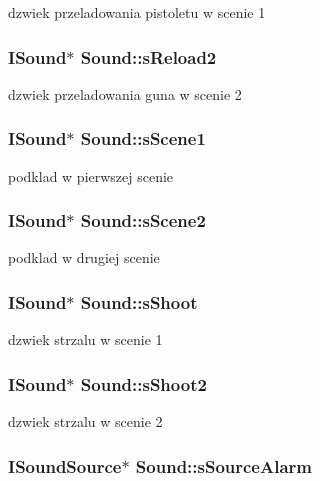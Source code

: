 \label{class_sound_af7bd98fddb7793a24c3159a77df5ee08}
dzwiek przeladowania pistoletu w scenie 1 \hypertarget{class_sound_ae71eeccc328dd51f772f5a196179cb25}{
\subsubsection[{sReload2}]{\setlength{\rightskip}{0pt plus 5cm}ISound$\ast$ {\bf Sound::sReload2}}}
\label{class_sound_ae71eeccc328dd51f772f5a196179cb25}
dzwiek przeladowania guna w scenie 2 \hypertarget{class_sound_a77990d3d0d401582f3d3fc291d6c05a2}{
\subsubsection[{sScene1}]{\setlength{\rightskip}{0pt plus 5cm}ISound$\ast$ {\bf Sound::sScene1}}}
\label{class_sound_a77990d3d0d401582f3d3fc291d6c05a2}
podklad w pierwszej scenie \hypertarget{class_sound_a9316f922062f2aada3c4d83088bb21e6}{
\subsubsection[{sScene2}]{\setlength{\rightskip}{0pt plus 5cm}ISound$\ast$ {\bf Sound::sScene2}}}
\label{class_sound_a9316f922062f2aada3c4d83088bb21e6}
podklad w drugiej scenie \hypertarget{class_sound_a8932916979c5479e73225def2abe1f42}{
\subsubsection[{sShoot}]{\setlength{\rightskip}{0pt plus 5cm}ISound$\ast$ {\bf Sound::sShoot}}}
\label{class_sound_a8932916979c5479e73225def2abe1f42}
dzwiek strzalu w scenie 1 \hypertarget{class_sound_a5aca3233d6b0c64c18eb3d572ecb2304}{
\subsubsection[{sShoot2}]{\setlength{\rightskip}{0pt plus 5cm}ISound$\ast$ {\bf Sound::sShoot2}}}
\label{class_sound_a5aca3233d6b0c64c18eb3d572ecb2304}
dzwiek strzalu w scenie 2 \hypertarget{class_sound_a0c689fbdc20fbe58c0b5f2669a818838}{
\subsubsection[{sSourceAlarm}]{\setlength{\rightskip}{0pt plus 5cm}ISoundSource$\ast$ {\bf Sound::sSourceAlarm}}}
